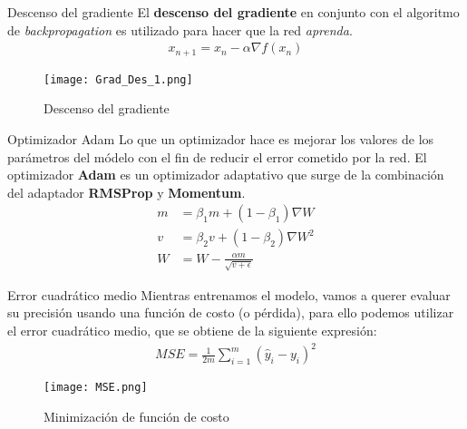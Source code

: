 \begin{frame}{Descenso del gradiente}
    El \textbf{descenso del gradiente} en conjunto con el algoritmo de \emph{backpropagation} es utilizado para hacer que la red
    \emph{aprenda}.
    \begin{align}
        \label{eqn:SRCNN_DescensoGradiente}
        x_{n+1}=x_n-\alpha\nabla f(x_n)
    \end{align}
    \begin{figure}[H]
        \label{fig:SRCNN_GradDescent}
        \centering
        \texttt{[image: Grad\_Des\_1.png]}
        \caption{Descenso del gradiente}
    \end{figure}
\end{frame}

\begin{frame}{Optimizador Adam}
    Lo que un optimizador hace es mejorar los valores de los parámetros del módelo con el fin de reducir
    el error cometido por la red. El optimizador \textbf{Adam} es un optimizador adaptativo que surge de la combinación del
    adaptador \textbf{RMSProp} y \textbf{Momentum}.
    \begin{equation}
        \label{eqn:SRCNN_Adam}
        \begin{split}
            m&=\beta_1m+(1-\beta_1)\nabla W\\
            v&=\beta_2v+(1-\beta_2)\nabla W^2\\
            W&=W-\frac{\alpha m}{\sqrt{v+\epsilon}}
        \end{split}
    \end{equation}
\end{frame}

\begin{frame}{Error cuadrático medio}
    Mientras entrenamos el modelo, vamos a querer evaluar su precisión usando una función de costo (o pérdida), para ello podemos
    utilizar el error cuadrático medio, que se obtiene de la siguiente expresión:
    \begin{align}
        \label{eqn:SRCNN_MSE}
        MSE=\frac{1}{2m}\sum_{i=1}^{m}(\hat{y}_i-y_i)^2
    \end{align}
    \begin{figure}[H]
        \label{fig:SRCNN_MSE}
        \centering
        \texttt{[image: MSE.png]}
        \caption{Minimización de función de costo}
    \end{figure}
\end{frame}


